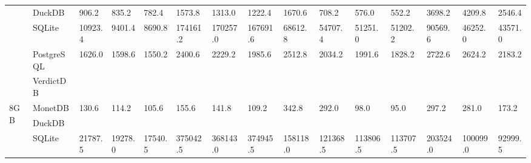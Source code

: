 \begin{table}[]
\begin{tabular}{ll|lllllllllllll}
                     & DuckDB     & 906.2                   & 835.2                   & 782.4                   & 1573.8                  & 1313.0                  & 1222.4                  & 1670.6                  & 708.2                   & 576.0                   & 552.2                   & 3698.2                  & 4209.8                  & 2546.4                  \\
                     & SQLite     & 10923.4                 & 9401.4                  & 8690.8                  & 174161.2                & 170257.0                & 167691.6                & 68612.8                 & 54707.4                 & 51251.0                 & 51202.2                 & 90569.6                 & 46252.0                 & 43571.0                 \\
                     & PostgreSQL & 1626.0                  & 1598.6                  & 1550.2                  & 2400.6                  & 2229.2                  & 1985.6                  & 2512.8                  & 2034.2                  & 1991.6                  & 1828.2                  & 2722.6                  & 2624.2                  & 2183.2                  \\
                     & VerdictDB  &                         &                         &                         &                         &                         &                         &                         &                         &                         &                         &                         &                         &                         \\ \hline
\multirow{5}{*}{8GB} & MonetDB    & 130.6                   & 114.2                   & 105.6                   & 155.6                   & 141.8                   & 109.2                   & 342.8                   & 292.0                   & 98.0                    & 95.0                    & 297.2                   & 281.0                   & 173.2                   \\
                     & DuckDB     &                         &                         &                         &                         &                         &                         &                         &                         &                         &                         &                         &                         &                         \\
                     & SQLite     & 21787.5                 & 19278.0                 & 17540.5                 & 375042.5                & 368143.0                & 374945.5                & 158118.0                & 121368.5                & 113806.5                & 113707.5                & 203524.0                & 100099.0                & 92999.5                 \\

\end{tabular}
\end{table}
